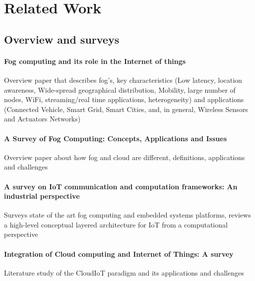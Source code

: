 \section{Related Work}




\subsection{Overview and surveys}

\paragraph{Fog computing and its role in the Internet of things} \cite{Bonomi:2012:FCR:2342509.2342513}
Overview paper that describes fog's, key characteristics (Low latency, location awareness, Wide-spread geographical distribution, Mobility, large number of nodes, WiFi, streaming/real time applications, heterogeneity) and applications (Connected Vehicle, Smart Grid, Smart Cities, and, in general, Wireless Sensors and Actuators Networks)

\paragraph{A Survey of Fog Computing: Concepts, Applications and Issues} \cite{Yi:2015:SFC:2757384.2757397}
Overview paper about how fog and cloud are different, definitions, applications and challenges

\paragraph{A survey on IoT communication and computation frameworks: An industrial perspective}\cite{7868354}
Surveys state of the art fog computing and embedded systems platforms, reviews a high-level conceptual layered architecture for IoT from a computational perspective

\paragraph{Integration of Cloud computing and Internet of Things: A survey}\cite{botta_integration_2016}
Literature study of the CloudIoT paradigm and its applications and challenges

